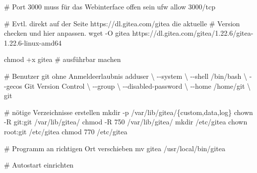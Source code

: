 \documentclass[
  letterpaper,
  DIV=11]{scrreprt}
\newenvironment{Shaded}{\begin{snugshade}}{\end{snugshade}}
\newcommand{\AttributeTok}[1]{\textcolor[rgb]{0.40,0.45,0.13}{#1}}
\newcommand{\CommentTok}[1]{\textcolor[rgb]{0.37,0.37,0.37}{#1}}
\newcommand{\DataTypeTok}[1]{\textcolor[rgb]{0.68,0.00,0.00}{#1}}
\newcommand{\ExtensionTok}[1]{\textcolor[rgb]{0.00,0.23,0.31}{#1}}
\newcommand{\FunctionTok}[1]{\textcolor[rgb]{0.28,0.35,0.67}{#1}}
\newcommand{\NormalTok}[1]{\textcolor[rgb]{0.00,0.23,0.31}{#1}}
\newcommand{\OperatorTok}[1]{\textcolor[rgb]{0.37,0.37,0.37}{#1}}
\newcommand{\StringTok}[1]{\textcolor[rgb]{0.13,0.47,0.30}{#1}}
\begin{document}
\begin{Shaded}
\begin{Highlighting}[]

\CommentTok{\# Port 3000 muss für das Webinterface offen sein}
\ExtensionTok{ufw}\NormalTok{ allow 3000/tcp}

\CommentTok{\# Evtl. direkt auf der Seite https://dl.gitea.com/gitea die aktuelle}
\CommentTok{\# Version checken  und hier anpassen.}
\FunctionTok{wget} \AttributeTok{{-}O}\NormalTok{ gitea https://dl.gitea.com/gitea/1.22.6/gitea{-}1.22.6{-}linux{-}amd64}

\FunctionTok{chmod}\NormalTok{ +x gitea  }\CommentTok{\# ausführbar machen}

\CommentTok{\# Benutzer git ohne Anmeldeerlaubnis}
\ExtensionTok{adduser} \DataTypeTok{\textbackslash{}}
   \AttributeTok{{-}{-}system} \DataTypeTok{\textbackslash{}}
   \AttributeTok{{-}{-}shell}\NormalTok{ /bin/bash }\DataTypeTok{\textbackslash{}}
   \AttributeTok{{-}{-}gecos} \StringTok{\textquotesingle{}Git Version Control\textquotesingle{}} \DataTypeTok{\textbackslash{}}
   \AttributeTok{{-}{-}group} \DataTypeTok{\textbackslash{}}
   \AttributeTok{{-}{-}disabled{-}password} \DataTypeTok{\textbackslash{}}
   \AttributeTok{{-}{-}home}\NormalTok{ /home/git }\DataTypeTok{\textbackslash{}}
\NormalTok{   git}

\CommentTok{\# nötige Verzeichnisse erstellen}
\FunctionTok{mkdir} \AttributeTok{{-}p}\NormalTok{ /var/lib/gitea/}\DataTypeTok{\{custom}\OperatorTok{,}\DataTypeTok{data}\OperatorTok{,}\DataTypeTok{log\}}
\FunctionTok{chown} \AttributeTok{{-}R}\NormalTok{ git:git /var/lib/gitea/}
\FunctionTok{chmod} \AttributeTok{{-}R}\NormalTok{ 750 /var/lib/gitea/}
\FunctionTok{mkdir}\NormalTok{ /etc/gitea}
\FunctionTok{chown}\NormalTok{ root:git /etc/gitea}
\FunctionTok{chmod}\NormalTok{ 770 /etc/gitea}

\CommentTok{\# Programm an richtigen Ort verschieben}
\FunctionTok{mv}\NormalTok{ gitea /usr/local/bin/gitea}

\CommentTok{\# Autostart einrichten }


\end{Highlighting}
\end{Shaded}
\end{document}
